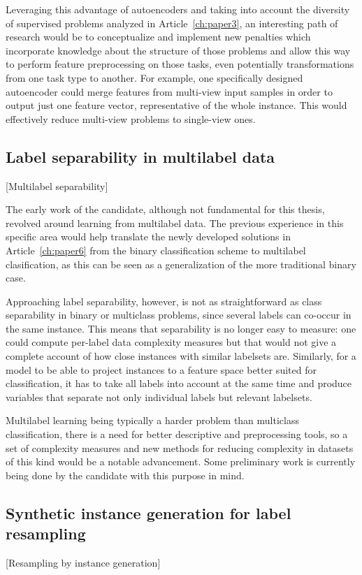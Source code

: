 Leveraging this advantage of autoencoders and taking into account the diversity of supervised problems analyzed in Article~\ref{ch:paper3}, an interesting path of research would be to conceptualize and implement new penalties which incorporate knowledge about the structure of those problems and allow this way to perform feature preprocessing on those tasks, even potentially transformations from one task type to another. For example, one specifically designed autoencoder could merge features from multi-view input samples in order to output just one feature vector, representative of the whole instance. This would effectively reduce multi-view problems to single-view ones.

\subsection{Label separability in multilabel data}[Multilabel separability]

The early work of the candidate, although not fundamental for this thesis, revolved around learning from multilabel data. The previous experience in this specific area would help translate the newly developed solutions in Article~\ref{ch:paper6} from the binary classification scheme to multilabel clasification, as this can be seen as a generalization of the more traditional binary case. 

Approaching label separability, however, is not as straightforward as class separability in binary or multiclass problems, since several labels can co-occur in the same instance. This means that separability is no longer easy to measure: one could compute per-label data complexity measures but that would not give a complete account of how close instances with similar labelsets are. Similarly, for a model to be able to project instances to a feature space better suited for classification, it has to take all labels into account at the same time and produce variables that separate not only individual labels but relevant labelsets.

Multilabel learning being typically a harder problem than multiclass classification, there is a need for better descriptive and preprocessing tools, so a set of complexity measures and new methods for reducing complexity in datasets of this kind would be a notable advancement. Some preliminary work is currently being done by the candidate with this purpose in mind.

\subsection{Synthetic instance generation for label resampling}[Resampling by instance generation]

